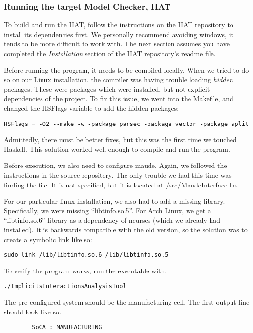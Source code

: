     \subsubsection{Running the target Model Checker, IIAT}
    To build and run the IIAT, follow the instructions on the IIAT repository to install its dependencies first. %
    We personally recommend avoiding windows, it tends to be more difficult to work with.
    The next section assumes you have completed the \textit{Installation} section of the IIAT repository's readme file.

    Before running the program, it needs to be compiled locally.
    When we tried to do so on our Linux installation, the compiler was having trouble loading \textit{hidden} packages.
    These were packages which were installed, but not explicit dependencies of the project.
    To fix this issue, we went into the Makefile, and changed the HSFlags variable to add the hidden packages:
    \begin{verbatim}HSFlags = -O2 --make -w -package parsec -package vector -package split\end{verbatim}
    Admittedly, there must be better fixes, but this was the first time we touched Haskell.
    This solution worked well enough to compile and run the program.

    Before execution, we also need to configure maude.
    Again, we followed the instructions in the source repository.
    The only trouble we had this time was finding the file.
    It is not specified, but it is located at /src/MaudeInterface.lhs.

    For our particular linux installation, we also had to add a missing library.
    Specifically, we were missing ``libtinfo.so.5''.
    For Arch Linux, we get a ``libtinfo.so.6'' library as a dependency of ncurses (which we already had installed).
    It is backwards compatible with the old version, so the solution was to create a symbolic link like so:
    \begin{verbatim}sudo link /lib/libtinfo.so.6 /lib/libtinfo.so.5\end{verbatim}

    To verify the program works, run the executable with:
    \begin{verbatim}./ImplicitsInteractionsAnalysisTool\end{verbatim}
    The pre-configured system should be the manufacturing cell.
    The first output line should look like so:
    \begin{verbatim}
        SoCA : MANUFACTURING
    \end{verbatim}

